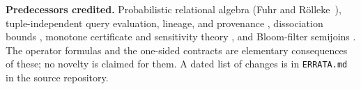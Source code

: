 \begin{center}
{\begin{minipage}{0.93\linewidth}
\textbf{Predecessors credited.} Probabilistic relational algebra
(Fuhr and R{\"o}lleke~\cite{fuhr1997pra}), tuple-independent query evaluation,
lineage, and provenance \cite{dalvi2007efficient,benjelloun2008uldb,green2007provenance,suciu2011},
dissociation bounds \cite{gatterbauer2014bounds}, monotone certificate and
sensitivity theory \cite{blanc2022counterfactuals}, and Bloom-filter semijoins
\cite{mullin1990semijoins}. The operator formulas and the one-sided contracts are
elementary consequences of these; no novelty is claimed for them.
A dated list of changes is in \texttt{ERRATA.md} in the source repository.
\end{minipage}}
\end{center}
\endgroup
